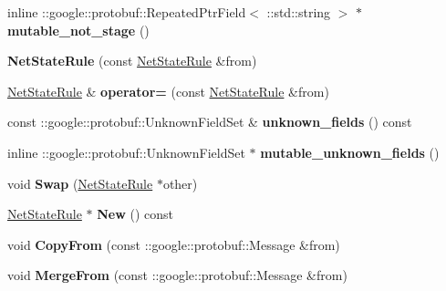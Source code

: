 \begin{DoxyCompactItemize}
inline \+::google\+::protobuf\+::\+Repeated\+Ptr\+Field$<$ \+::std\+::string $>$ $\ast$ {\bfseries mutable\+\_\+not\+\_\+stage} ()
\item 
\mbox{\label{classcaffe_1_1_net_state_rule_a0d2c409a9d9757ba193831dbf2aeb463}} 
{\bfseries Net\+State\+Rule} (const \mbox{\hyperlink{classcaffe_1_1_net_state_rule}{Net\+State\+Rule}} \&from)
\item 
\mbox{\label{classcaffe_1_1_net_state_rule_afe65d268b02f0cd2a4a8a9fd8ac134da}} 
\mbox{\hyperlink{classcaffe_1_1_net_state_rule}{Net\+State\+Rule}} \& {\bfseries operator=} (const \mbox{\hyperlink{classcaffe_1_1_net_state_rule}{Net\+State\+Rule}} \&from)
\item 
\mbox{\label{classcaffe_1_1_net_state_rule_a0cb22959c6c137df42557263ab6a7930}} 
const \+::google\+::protobuf\+::\+Unknown\+Field\+Set \& {\bfseries unknown\+\_\+fields} () const
\item 
\mbox{\label{classcaffe_1_1_net_state_rule_a53244da02e82d8be0fc48e100b183b52}} 
inline \+::google\+::protobuf\+::\+Unknown\+Field\+Set $\ast$ {\bfseries mutable\+\_\+unknown\+\_\+fields} ()
\item 
\mbox{\label{classcaffe_1_1_net_state_rule_a5e012fd32d19636a3736312dbea9c3c9}} 
void {\bfseries Swap} (\mbox{\hyperlink{classcaffe_1_1_net_state_rule}{Net\+State\+Rule}} $\ast$other)
\item 
\mbox{\label{classcaffe_1_1_net_state_rule_aa083f0fe6f5bda21e531f8af379a9a0f}} 
\mbox{\hyperlink{classcaffe_1_1_net_state_rule}{Net\+State\+Rule}} $\ast$ {\bfseries New} () const
\item 
\mbox{\label{classcaffe_1_1_net_state_rule_ac1e672b74c39e355c39bbf4c96becf3a}} 
void {\bfseries Copy\+From} (const \+::google\+::protobuf\+::\+Message \&from)
\item 
\mbox{\label{classcaffe_1_1_net_state_rule_ab0c515f271bf3b200704878e5975d844}} 
void {\bfseries Merge\+From} (const \+::google\+::protobuf\+::\+Message \&from)

\end{DoxyCompactItemize}
